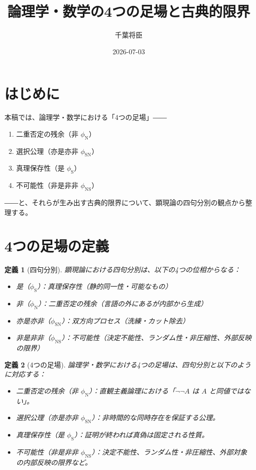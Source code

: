 \documentclass[11pt,a4paper]{ltjsarticle}
\title{論理学・数学の4つの足場と古典的限界}
\author{千葉将臣}
\date{2026-07-03}
\newtheorem{definition}{定義}
\newcommand{\phiS}{\phi_{\text{S}}}
\newcommand{\phiN}{\phi_{\text{N}}}
\newcommand{\phiSN}{\phi_{\text{SN}}}
\newcommand{\phiNS}{\phi_{\text{NS}}}
\begin{document}
\maketitle

\section{はじめに}

本稿では、論理学・数学における「4つの足場」――
\begin{enumerate}[label=(\arabic*)]
  \item 二重否定の残余（非 $\phiN$）
  \item 選択公理（亦是亦非 $\phiSN$）
  \item 真理保存性（是 $\phiS$）
  \item 不可能性（非是非非 $\phiNS$）
\end{enumerate}
――と、それらが生み出す古典的限界について、顕現論の四句分別の観点から整理する。

\section{4つの足場の定義}

\begin{definition}[四句分別]
  顕現論における四句分別は、以下の4つの位相からなる：
  \begin{itemize}
    \item 是（$\phiS$）：真理保存性（静的同一性・可能なもの）
    \item 非（$\phiN$）：二重否定の残余（言語の外にあるが内部から生成）
    \item 亦是亦非（$\phiSN$）：双方向プロセス（洗練・カット除去）
    \item 非是非非（$\phiNS$）：不可能性（決定不能性、ランダム性・非圧縮性、外部反映の限界）
  \end{itemize}
\end{definition}

\begin{definition}[4つの足場]
  論理学・数学における4つの足場は、四句分別と以下のように対応する：
  \begin{itemize}
    \item 二重否定の残余（非 $\phiN$）：直観主義論理における「$\neg\neg A$ は $A$ と同値ではない」。
    \item 選択公理（亦是亦非 $\phiSN$）：非時間的な同時存在を保証する公理。
    \item 真理保存性（是 $\phiS$）：証明が終われば真偽は固定される性質。
    \item 不可能性（非是非非 $\phiNS$）：決定不能性、ランダム性・非圧縮性、外部対象の内部反映の限界など。
  \end{itemize}
\end{definition}
\end{document}

